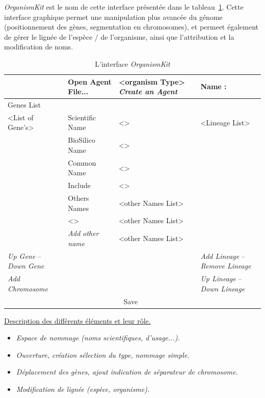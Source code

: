 \documentclass[11pt,twoside,a4paper]{article}
\begin{document}
\emph{OrganismKit} est le nom de cette interface pr{\'e}sent{\'e}e dans le tableau~\ref{tab:OrganismKit}. Cette interface graphique permet une manipulation plus avanc{\'e}e du g{\'e}nome (positionnement des g{\`e}nes, segmentation en chromosomes), et permeet {\'e}galement de g{\'e}rer le lign{\'e}e de l'esp{\`e}ce / de l'organisme, ainsi que l'attribution et la modification de noms. 


\begin{table}[h]
	\centering
	\begin{scriptsize}
	\begin{tabular}{|l|l|l|l|}
	\hline
				& Open Agent File...	& <organism Type> \emph{Create an Agent} & Name : 	   	     \\
	\hline
	Genes List		& \multicolumn{3}{|c|}{~}							 	     \\
				\cline{2-4}
	<List of Gene's>	& Scientific Name		& <>				 & <Lineage List>	     \\
				& BioSilico Name				& <>				 & 			     \\
				& Common Name					& <>				 & 			     \\
				& Include						& <>				 & 			     \\
				\cline{2-3}
				& Others Names				& <other Names List>		 & 			     \\
				& <>						& <other Names List>		 & 			     \\
				& \emph{Add other name}		& <other Names List>		 & 			     \\
	\hline
	\emph{Up Gene} -- \emph{Down Gene}	& \multicolumn{2}{|c|}{~}		& \emph{Add Lineage} -- \emph{Remove Lineage} \\
	\emph{Add Chromosome}				& \multicolumn{2}{|c|}{~}		& \emph{Up Lineage}  -- \emph{Down Lineage}   \\
	\hline
				& \multicolumn{2}{|c|}{Save}					& 		      \\
	\hline
	\end{tabular}
	\caption[L'interface \emph{OrganismKit}]{L'interface \emph{OrganismKit}}
	\label{tab:OrganismKit}
	\end{scriptsize}
\end{table}

\underline{Description des diff{\'e}rents {\'e}l{\'e}ments et leur r{\^o}le. }
\begin{itemize}
	\item \emph{Espace de nommage (noms scientifiques, d'usage...). }
	\item \emph{Ouverture, cr{\'e}ation s{\'e}lection du type, nommage simple. }
	\item \emph{D{\'e}placement des g{\`e}nes, ajout indication de s{\'e}parateur de chromosome. }
	\item \emph{Modification de lign{\'e}e (esp{\`e}ce, organisme). }
\end{itemize}
\end{document}
